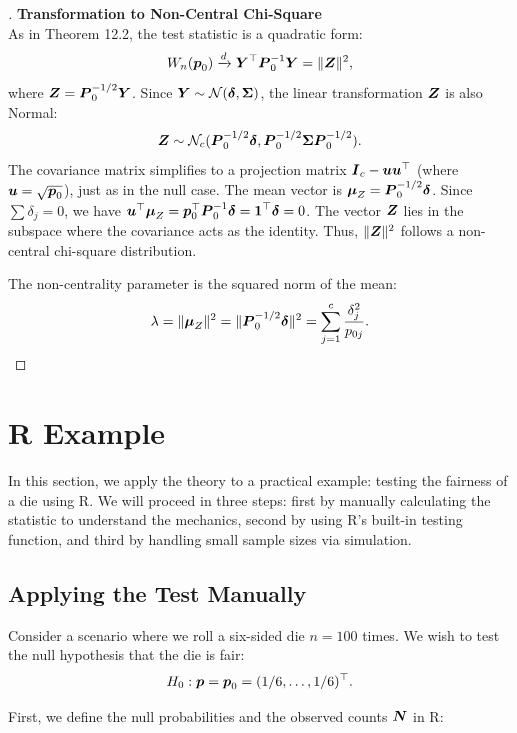 \begin{proof}[]
\textbf{Transformation to Non-Central Chi-Square} \\
As in Theorem 12.2, the test statistic is a quadratic form:
\[
    W_n(\boldsymbol{p}_0) \xrightarrow{d} \boldsymbol{Y}^\top \boldsymbol{P}_0^{-1} \boldsymbol{Y} = \|\boldsymbol{Z}\|^2,
\]
where $\boldsymbol{Z} = \boldsymbol{P}_0^{-1/2} \boldsymbol{Y}$. Since $\boldsymbol{Y} \sim \mathcal{N}(\boldsymbol{\delta}, \boldsymbol{\Sigma})$, the linear transformation $\boldsymbol{Z}$ is also Normal:
\[
    \boldsymbol{Z} \sim \mathcal{N}_c(\boldsymbol{P}_0^{-1/2}\boldsymbol{\delta}, \boldsymbol{P}_0^{-1/2}\boldsymbol{\Sigma}\boldsymbol{P}_0^{-1/2}).
\]
The covariance matrix simplifies to a projection matrix $\boldsymbol{I}_c - \boldsymbol{u}\boldsymbol{u}^\top$ (where $\boldsymbol{u} = \sqrt{\boldsymbol{p}_0}$), just as in the null case.
The mean vector is $\boldsymbol{\mu}_Z = \boldsymbol{P}_0^{-1/2}\boldsymbol{\delta}$.
Since $\sum \delta_j = 0$, we have $\boldsymbol{u}^\top \boldsymbol{\mu}_Z = \boldsymbol{p}_0^{\top} \boldsymbol{P}_0^{-1} \boldsymbol{\delta} = \boldsymbol{1}^\top \boldsymbol{\delta} = 0$.
The vector $\boldsymbol{Z}$ lies in the subspace where the covariance acts as the identity. Thus, $\|\boldsymbol{Z}\|^2$ follows a non-central chi-square distribution.

The non-centrality parameter is the squared norm of the mean:
\[
    \lambda = \|\boldsymbol{\mu}_Z\|^2 = \|\boldsymbol{P}_0^{-1/2}\boldsymbol{\delta}\|^2 = \sum\limits_{j=1}^c \frac{\delta_j^2}{p_{0j}}.
\]
\end{proof}

\section{R Example}
\label{sec:R_Example}

In this section, we apply the theory to a practical example: testing the fairness of a die using R. We will proceed in three steps: first by manually calculating the statistic to understand the mechanics, second by using R's built-in testing function, and third by handling small sample sizes via simulation.

\subsection{Applying the Test Manually}
\label{sub:Applying_Manual}

Consider a scenario where we roll a six-sided die $n=100$ times. We wish to test the null hypothesis that the die is fair:
\[
    H_0: \boldsymbol{p} = \boldsymbol{p}_0 = (1/6, \dots, 1/6)^\top.
\]

First, we define the null probabilities and the observed counts $\boldsymbol{N}$ in R:


